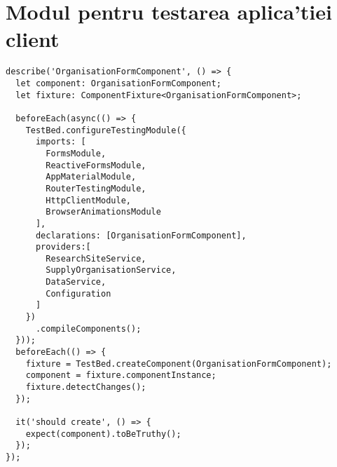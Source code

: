 \chapter{Modul pentru testarea aplica'tiei client}
\label{app:test}
\begin{verbatim}
describe('OrganisationFormComponent', () => {
  let component: OrganisationFormComponent;
  let fixture: ComponentFixture<OrganisationFormComponent>;

  beforeEach(async(() => {
    TestBed.configureTestingModule({
      imports: [
        FormsModule,
        ReactiveFormsModule,
        AppMaterialModule,
        RouterTestingModule,
        HttpClientModule,
        BrowserAnimationsModule
      ],
      declarations: [OrganisationFormComponent],
      providers:[
        ResearchSiteService,
        SupplyOrganisationService,
        DataService,
        Configuration
      ]
    })
      .compileComponents();
  }));
  beforeEach(() => {
    fixture = TestBed.createComponent(OrganisationFormComponent);
    component = fixture.componentInstance;
    fixture.detectChanges();
  });

  it('should create', () => {
    expect(component).toBeTruthy();
  });
});
\end{verbatim}

